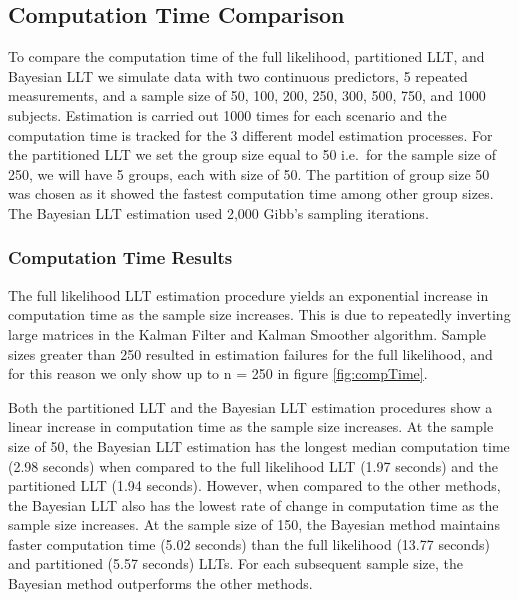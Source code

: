 \documentclass[
]{article}
\begin{document}
\hypertarget{computation-time-comparison}{%
\subsection{Computation Time Comparison}\label{computation-time-comparison}}

To compare the computation time of the full likelihood, partitioned LLT, and Bayesian LLT we simulate data with two continuous predictors, 5 repeated measurements, and a sample size of 50, 100, 200, 250, 300, 500, 750, and 1000 subjects. Estimation is carried out 1000 times for each scenario and the computation time is tracked for the 3 different model estimation processes. For the partitioned LLT we set the group size equal to 50 i.e.~for the sample size of 250, we will have 5 groups, each with size of 50. The partition of group size 50 was chosen as it showed the fastest computation time among other group sizes. The Bayesian LLT estimation used 2,000 Gibb's sampling iterations.

\hypertarget{computation-time-results}{%
\subsubsection{Computation Time Results}\label{computation-time-results}}

The full likelihood LLT estimation procedure yields an exponential increase in computation time as the sample size increases. This is due to repeatedly inverting large matrices in the Kalman Filter and Kalman Smoother algorithm. Sample sizes greater than 250 resulted in estimation failures for the full likelihood, and for this reason we only show up to n = 250 in figure \ref{fig:compTime}.

Both the partitioned LLT and the Bayesian LLT estimation procedures show a linear increase in computation time as the sample size increases. At the sample size of 50, the Bayesian LLT estimation has the longest median computation time (2.98 seconds) when compared to the full likelihood LLT (1.97 seconds) and the partitioned LLT (1.94 seconds). However, when compared to the other methods, the Bayesian LLT also has the lowest rate of change in computation time as the sample size increases. At the sample size of 150, the Bayesian method maintains faster computation time (5.02 seconds) than the full likelihood (13.77 seconds) and partitioned (5.57 seconds) LLTs. For each subsequent sample size, the Bayesian method outperforms the other methods.
\end{document}
